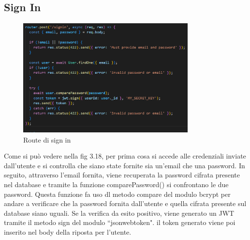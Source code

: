 \subsection*{Sign In}

\begin{figure}[H]
   \centering
    \includegraphics[width=9cm, height=6cm]{images/signinServer.png}
    \caption[differenzeiteot]{Route di sign in}
    \label{fig:Route sign in}
\end{figure}

Come si pu\`o vedere nella fig 3.18, per prima cosa si accede alle credenziali inviate dall'utente e si controlla che siano state fornite sia un'email che una password. In seguito, attraverso l'email fornita, viene recuperata la password cifrata presente
nel database e tramite la funzione comparePassword() si confrontano le due password. Questa funzione fa uso dl metodo compare del modulo bcrypt per andare a verificare che la password fornita dall'utente e quella cifrata presente sul database siano uguali.
 Se la verifica da esito positivo, viene generato un JWT tramite il metodo sign del modulo ``jsonwebtoken". il token generato viene poi inserito nel body della riposta per l'utente.
